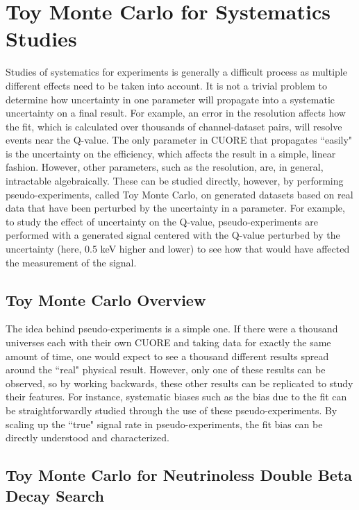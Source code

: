 \chapter{Toy Monte Carlo for Systematics Studies}

Studies of systematics for experiments is generally a difficult process as multiple different effects need to be taken into account.
It is not a trivial problem to determine how uncertainty in one parameter will propagate into a systematic uncertainty on a final result.
For example, an error in the resolution affects how the fit, which is calculated over thousands of channel-dataset pairs, will resolve events near the Q-value.
The only parameter in CUORE that propagates ``easily" is the uncertainty on the efficiency, which affects the result in a simple, linear fashion. However, other parameters, such as the resolution, are, in general, intractable algebraically.
These can be studied directly, however, by performing pseudo-experiments, called Toy Monte Carlo, on generated datasets based on real data that have been perturbed by the uncertainty in a parameter.
For example, to study the effect of uncertainty on the Q-value, pseudo-experiments are performed with a generated signal centered with the Q-value perturbed by the uncertainty (here, 0.5 keV higher and lower) to see how that would have affected the measurement of the signal.


\section{Toy Monte Carlo Overview}

The idea behind pseudo-experiments is a simple one.
If there were a thousand universes each with their own CUORE and taking data for exactly the same amount of time, one would expect to see a thousand different results spread around the ``real" physical result.
However, only one of these results can be observed, so by working backwards, these other results can be replicated to study their features.
For instance, systematic biases such as the bias due to the fit can be straightforwardly studied through the use of these pseudo-experiments.
By scaling up the ``true" signal rate in pseudo-experiments, the fit bias can be directly understood and characterized.

\section{Toy Monte Carlo for Neutrinoless Double Beta Decay Search}

